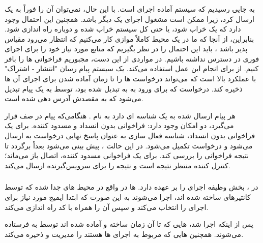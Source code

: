 \subsubsection*{}

به جایی رسیدیم که سیستم آماده اجرای  است. با این حال، نمی‌توان آن  را فوراً به یک  ارسال کرد، زیرا ممکن است مشغول اجرای یک  دیگر باشد. همچنین این احتمال وجود دارد که یک  خراب شود، یا حتی کل سیستم خراب شده و دوباره راه اندازی شود. بنابراین، از آنجا که ما در یک محیط کاملاً موازی کار می‌کنیم که انتظار می‌رود مقیاس پذیر باشد ، باید این احتمال را در نظر بگیریم که منابع مورد نیاز خود را برای اجرای فوری  در دسترس نداشته باشیم. در مواردی از این دست، مجبوریم فراخوانی ها را بافر کنیم.  از  برای انجام این عمل استفاده می‌کند.  یک سیستم پیام رسان "انتشار - اشتراک" با عملکرد بالا است که می‌تواند درخواست ها را تا زمان آماده شدن برای اجرای آن ها ذخیره کند. درخواست که برای ورود به  به  تبدیل شده بود، توسط  به یک پیام  تبدیل می‌شود که به  مقصدش آدرس دهی شده است.

هر پیام ارسال شده به یک  شناسه ای دارد به نام . هنگامی‌که پیام در صف  قرار می‌گیرد، دو امکان وجود دارد: فراخوانی بدون انسداد و مسدود کننده. برای یک فراخوانی بدون انسداد‌، شناسه فعال سازی به عنوان پاسخ نهایی درخواست به  ارسال می‌شود و درخواست تکمیل می‌شود. در این حالت ، پیش بینی می‌شود  بعداً برگردد تا نتیجه فراخوانی را بررسی کند. برای یک فراخوانی مسدود کننده، اتصال باز می‌ماند؛ کنترل کننده منتظر نتیجه  است و نتیجه را برای سرویس‌گیرنده ارسال می‌کند.

\subsubsection*{}

در ، بخش  وظیفه اجرای  را بر عهده دارد.  ها در واقع در محیط های جدا شده که توسط کانتیرهای  ساخته شده اند، اجرا می‌شوند به این صورت که  ابتدا ایمیج  مورد نیاز برای اجرای  را انتخاب می‌کند و سپس آن را همراه با کد  راه اندازی می‌کند.

پس از اینکه  اجرا شد،  هایی که تا آن زمان ساخته و آماده شده اند توسط  به  فرستاده می‌شوند.  همچنین  هایی که مربوط به اجرای  ها هستند را مدیریت و ذخیره می‌کند.

